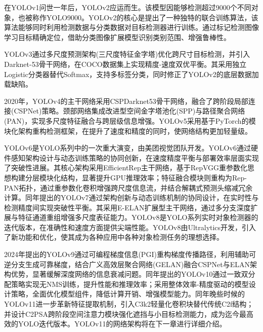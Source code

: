 在YOLOv1问世一年后，YOLOv2应运而生\cite{yolov2}。该模型因能够检测超过9000个不同对象，也被称作YOLO9000。YOLOv2的核心是提出了一种独特的联合训练算法，该算法能够同时利用检测数据与分类数据对目标检测器进行训练。通过标记检测图像学习目标精确定位，借助分类图像扩展模型识别类别范围、增强鲁棒性。

YOLOv3通过多尺度预测架构(三尺度特征金字塔)优化跨尺寸目标检测，并引入Darknet-53骨干网络，在COCO数据集上实现精度-速度双优平衡\cite{yolov3}。其采用独立Logistic分类器替代Softmax，支持多标签分类，同时修正了YOLOv2的底层数据加载缺陷。

2020年，YOLOv4的主干网络采用CSPDarknet53骨干网络，融合了跨阶段局部连接(CSPNet)策略。颈部网络集成改进型空间金字塔池化(SPP)与路径聚合网络(PAN)，实现多尺度特征融合与跨层级信息增强\cite{yolov4}。YOLOv5采用基于PyTorch的模块化架构重构检测框架，在提升了速度和精度的同时，使网络结构更加轻量级。

YOLOv6是YOLO系列中的一次重大演变，由美团视觉团队开发\cite{yolov6}。YOLOv6通过硬件感知架构设计与动态训练策略的协同创新，在速度精度平衡与部署效率层面实现了突破性进展。其核心架构采用EfficientRep主干网络，基于RepVGG重参数化思想构建分层模块化结构，显著提升GPU推理效率；特征融合模块则重构为Rep-PAN拓扑，通过重参数化卷积增强跨尺度信息流，并结合解耦式预测头缩减冗余计算。同年提出的YOLOv7通过架构创新与动态训练机制的协同设计，在实时性与检测精度间实现突破性平衡\cite{yolov7}。其采用E-ELAN扩展型主干网络，通过多分支深度扩展与特征通道重组增强多尺度表征能力。YOLOv8是YOLO系列实时对象检测器的迭代版本，在准确性和速度方面提供尖端性能。YOLOv8由Ultralytics开发，引入了新功能和优化，使其成为各种应用中各种对象检测任务的理想选择。

2024年提出的YOLOv9通过可编程梯度信息(PGI)重构梯度传播路径，利用辅助可逆分支生成可靠梯度，结合广义高效层聚合网络(GELAN)融合CSPNet与ELAN架构优势，显著缓解深度网络的信息衰减问题\cite{yolov9}。同年提出的YOLOv10通过一致双分配策略实现无NMS训练，提升性能和推理效率；采用整体效率-精度驱动的模型设计策略，全面优化模型组件，降低计算开销、增强模型能力\cite{yolov10}。同年晚些时候的YOLOv11进一步革新特征提取机制，引入C3k2轻量化卷积块替代传统C2f结构；并设计C2PSA跨阶段空间注意力模块强化遮挡与小目标检测能力，成为迄今最高效的YOLO迭代版本。YOLOv11的网络架构将在下一章进行详细介绍。





